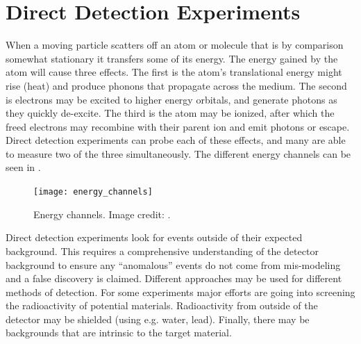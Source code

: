 











\section[Direct Detection Experiments][Direct Detection Experiments]{Direct Detection Experiments}
\label{sec:direct_detect}
When a moving particle scatters off an atom or molecule that is by comparison somewhat stationary it transfers some of its
energy.  The energy gained by the atom will cause three effects.  The first is the atom's translational energy might rise (heat) and
produce phonons that propagate across the medium.  The second is electrons may be excited to higher energy orbitals, and generate
photons
as they quickly de-excite.  The third is the atom may be ionized, after which the freed electrons may recombine with their parent ion
and emit photons or escape.  Direct detection experiments can probe each of these effects, and many are able to measure two of the three
simultaneously.  The different energy channels can be seen in .

\begin{figure}
\centering
\texttt{[image: energy\_channels]}
\caption{Energy channels.  Image credit: .}
\label{fig:energy_channels}
\end{figure}
 
Direct detection experiments look for events outside of their expected background.  This requires a comprehensive
understanding of the detector background to ensure any ``anomalous'' events do not come from mis-modeling and a false discovery is
claimed.  Different approaches may be
used for different methods of detection.  For some experiments major efforts are going into screening the radioactivity of
potential materials.  Radioactivity from outside of the detector may be shielded (using e.g. water, lead).  Finally, there may be
backgrounds that are intrinsic to the target material.

